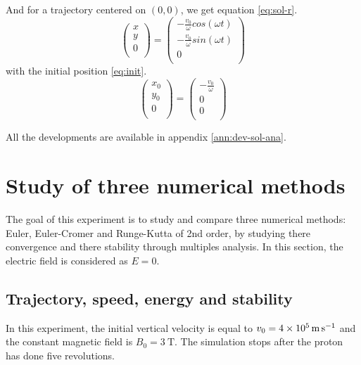 \documentclass[a4paper,12pt,twoside]{article}
\begin{document}
And for a trajectory centered on $(0,0)$, we get equation \ref{eq:sol-r}.
\begin{equation}
	\begin{pmatrix} x\\ y\\ 0\\ \end{pmatrix} = \begin{pmatrix} -\frac{v_0}{\omega} cos(\omega t)\\ -\frac{v_0}{\omega} sin(\omega t)\\ 0\\ \end{pmatrix}
\label{eq:sol-r}
\end{equation}
with the initial position \ref{eq:init}.
\begin{equation}
	\begin{pmatrix} x_0\\ y_0\\ 0\\ \end{pmatrix} = \begin{pmatrix} -\frac{v_0}{\omega}\\ 0\\ 0\\ \end{pmatrix}
\label{eq:init}
\end{equation}

All the developments are available in appendix \ref{ann:dev-sol-ana}.

\section{Study of three numerical methods}\label{sec:etudes-integrateur}
The goal of this experiment is to study and compare three numerical methods: Euler, Euler-Cromer and Runge-Kutta of 2nd order, by studying there convergence and there stability through multiples analysis.
In this section, the electric field is considered as $E = 0$.
\subsection{Trajectory, speed, energy and stability}
In this experiment, the initial vertical velocity is equal to $v_0 = \SI{4d5}{\meter\per\second}$ and the constant magnetic field is $B_0 = \SI{3}{\tesla}$.
The simulation stops after the proton has done five revolutions.
\end{document}
